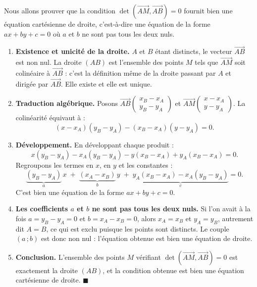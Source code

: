\documentclass[11pt]{article}
\begin{document}
\begin{experience}
Nous allons prouver que la condition $\det\left(\overrightarrow{AM},\overrightarrow{AB}\right) = 0$ fournit bien une équation cartésienne de droite, c'est-à-dire une équation de la forme $ax + by + c = 0$ où $a$ et $b$ ne sont pas tous les deux nuls.
\begin{enumerate}
\item \textbf{Existence et unicité de la droite.} $A$ et $B$ étant distincts, le vecteur $\overrightarrow{AB}$ est non nul. La droite $(AB)$ est l'ensemble des points $M$ tels que $\overrightarrow{AM}$ soit colinéaire à $\overrightarrow{AB}$ : c'est la définition même de la droite passant par $A$ et dirigée par $\overrightarrow{AB}$. Elle existe et elle est unique.
\item \textbf{Traduction algébrique.} Posons $\overrightarrow{AB}\begin{pmatrix} x_B - x_A \\ y_B - y_A \end{pmatrix}$ et $\overrightarrow{AM}\begin{pmatrix} x - x_A \\ y - y_A \end{pmatrix}$. La colinéarité équivaut à :
\[ (x - x_A)(y_B - y_A) - (x_B - x_A)(y - y_A) = 0. \]
\item \textbf{Développement.} En développant chaque produit :
\[ x(y_B - y_A) - x_A(y_B - y_A) - y(x_B - x_A) + y_A(x_B - x_A) = 0. \]
Regroupons les termes en $x$, en $y$ et les constantes :
\[ \underbrace{(y_B - y_A)}_{a}\,x \;+\; \underbrace{(x_A - x_B)}_{b}\,y \;+\; \underbrace{y_A(x_B - x_A) - x_A(y_B - y_A)}_{c} = 0. \]
C'est bien une équation de la forme $ax + by + c = 0$.
\item \textbf{Les coefficients $a$ et $b$ ne sont pas tous les deux nuls.} Si l'on avait à la fois $a = y_B - y_A = 0$ et $b = x_A - x_B = 0$, alors $x_A = x_B$ et $y_A = y_B$, autrement dit $A = B$, ce qui est exclu puisque les points sont distincts. Le couple $(a\,;b)$ est donc non nul : l'équation obtenue est bien une équation de droite.
\item \textbf{Conclusion.} L'ensemble des points $M$ vérifiant $\det\left(\overrightarrow{AM},\overrightarrow{AB}\right) = 0$ est exactement la droite $(AB)$, et la condition obtenue est bien une équation cartésienne de droite. $\blacksquare$
\end{enumerate}
\end{experience}
\end{document}
